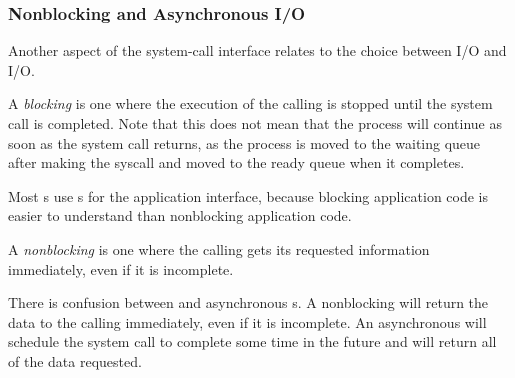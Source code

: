 \subsubsection{Nonblocking and Asynchronous I/O}\label{subsubsec:Nonblocking_Asynchronous_IO}
Another aspect of the system-call interface relates to the choice between  I/O and  I/O.

\begin{definition}[Blocking]\label{def:Blocking_Syscall}
  A \emph{blocking}  is one where the execution of the calling  is stopped until the system call is completed.
  Note that this does not mean that the process will continue as soon as the system call returns, as the process is moved to the waiting queue after making the syscall and moved to the ready queue when it completes.
\end{definition}

Most s use  s for the application interface, because blocking application code is easier to understand than nonblocking application code.

\begin{definition}[Nonblocking]\label{def:Nonblocking_Syscall}
  A \emph{nonblocking}  is one where the calling  gets its requested information immediately, even if it is incomplete.

  \begin{remark}
    There is confusion between  and asynchronous s.
    A nonblocking  will return the data to the calling  immediately, even if it is incomplete.
    An asynchronous  will schedule the system call to complete some time in the future and will return all of the data requested.
  \end{remark}
\end{definition}

